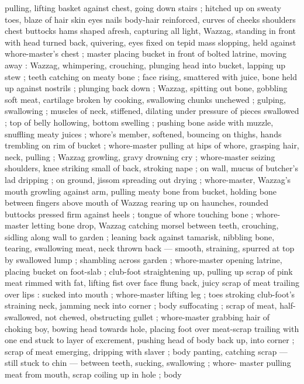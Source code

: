 pulling, lifting basket against chest, going down stairs ; hitched up on sweaty toes, blaze of hair skin eyes nails body-hair reinforced, curves of cheeks shoulders chest buttocks hams shaped afresh, capturing all light, Wazzag, standing in front with head turned back, quivering, eyes fixed on tepid mass slopping, held against whore-master's chest ; master placing bucket in front of bolted latrine, moving away : Wazzag, whimpering, crouching, plunging head into bucket, lapping up stew ; teeth catching on meaty bone ; face rising, smattered with juice, bone held up against nostrils ; plunging back down ; Wazzag, spitting out bone, gobbling soft meat, cartilage broken by cooking, swallowing chunks unchewed ; gulping, swallowing ; muscles of neck, stiffened, dilating under pressure of pieces swallowed ; top of belly hollowing, bottom swelling ; pushing bone aside with muzzle, snuffling meaty juices ; whore's member, softened, bouncing on thighs, hands trembling on rim of bucket ; whore-master pulling at hips of whore, grasping hair, neck, pulling ; Wazzag growling, gravy drowning cry ; whore-master seizing shoulders, knee striking small of back, stroking nape ; on wall, mucus of butcher's lad dripping ; on ground, jissom spreading out drying ; whore-master, Wazzag's mouth growling against arm, pulling meaty bone from bucket, holding bone between fingers above mouth of Wazzag rearing up on haunches, rounded buttocks pressed firm against heels ; tongue of whore touching bone ; whore-master letting bone drop, Wazzag catching morsel between teeth, crouching, sidling along wall to garden ; leaning back against tamarisk, nibbling bone, tearing, swallowing meat, neck thrown back --- smooth, straining, spurred at top by swallowed lump ; shambling across garden ; whore-master opening latrine, placing bucket on foot-slab ; club-foot straightening up, pulling up scrap of pink meat rimmed with fat, lifting fist over face flung back, juicy scrap of meat trailing over lips : sucked into mouth ; whore-master lifting leg ; toes stroking club-foot's straining neck, jamming neck into corner ; body suffocating ; scrap of meat, half-swallowed, not chewed, obstructing gullet ; whore-master grabbing hair of choking boy, bowing head towards 
hole, placing foot over meat-scrap trailing with one end stuck to layer 
of excrement, pushing head of body back up, into corner ; scrap of 
meat emerging, dripping with slaver ; body panting, catching scrap 
--- still stuck to chin --- between teeth, sucking, swallowing ; whore- 
master pulling meat from mouth, scrap coiling up in hole ; body 
